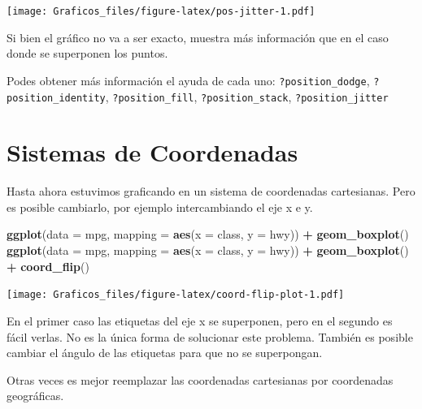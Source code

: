 \documentclass[]{book}
\newenvironment{Shaded}{\begin{snugshade}}{\end{snugshade}}
\newcommand{\DataTypeTok}[1]{\textcolor[rgb]{0.13,0.29,0.53}{#1}}
\newcommand{\KeywordTok}[1]{\textcolor[rgb]{0.13,0.29,0.53}{\textbf{#1}}}
\newcommand{\NormalTok}[1]{#1}
\newcommand{\OperatorTok}[1]{\textcolor[rgb]{0.81,0.36,0.00}{\textbf{#1}}}
\newcommand{\StringTok}[1]{\textcolor[rgb]{0.31,0.60,0.02}{#1}}
\theoremstyle{definition}
\theoremstyle{definition}
\theoremstyle{definition}
\theoremstyle{remark}
\begin{document}
\texttt{[image: Graficos\_files/figure-latex/pos-jitter-1.pdf]}

Si bien el gráfico no va a ser exacto, muestra más información que en el
caso donde se superponen los puntos.

Podes obtener más información el ayuda de cada uno:
\texttt{?position\_dodge}, \texttt{?position\_identity},
\texttt{?position\_fill}, \texttt{?position\_stack},
\texttt{?position\_jitter}

\hypertarget{sistemas-de-coordenadas}{%
\section{Sistemas de Coordenadas}\label{sistemas-de-coordenadas}}

Hasta ahora estuvimos graficando en un sistema de coordenadas
cartesianas. Pero es posible cambiarlo, por ejemplo intercambiando el
eje x e y.

\begin{Shaded}
\begin{Highlighting}[]
\KeywordTok{ggplot}\NormalTok{(}\DataTypeTok{data =}\NormalTok{ mpg, }\DataTypeTok{mapping =} \KeywordTok{aes}\NormalTok{(}\DataTypeTok{x =}\NormalTok{ class, }\DataTypeTok{y =}\NormalTok{ hwy)) }\OperatorTok{+}\StringTok{ }
\StringTok{  }\KeywordTok{geom_boxplot}\NormalTok{()}
\KeywordTok{ggplot}\NormalTok{(}\DataTypeTok{data =}\NormalTok{ mpg, }\DataTypeTok{mapping =} \KeywordTok{aes}\NormalTok{(}\DataTypeTok{x =}\NormalTok{ class, }\DataTypeTok{y =}\NormalTok{ hwy)) }\OperatorTok{+}\StringTok{ }
\StringTok{  }\KeywordTok{geom_boxplot}\NormalTok{() }\OperatorTok{+}
\StringTok{  }\KeywordTok{coord_flip}\NormalTok{()}
\end{Highlighting}
\end{Shaded}

\texttt{[image: Graficos\_files/figure-latex/coord-flip-plot-1.pdf]}

En el primer caso las etiquetas del eje x se superponen, pero en el
segundo es fácil verlas. No es la única forma de solucionar este
problema. También es posible cambiar el ángulo de las etiquetas para que
no se superpongan.

Otras veces es mejor reemplazar las coordenadas cartesianas por
coordenadas geográficas.
\end{document}
